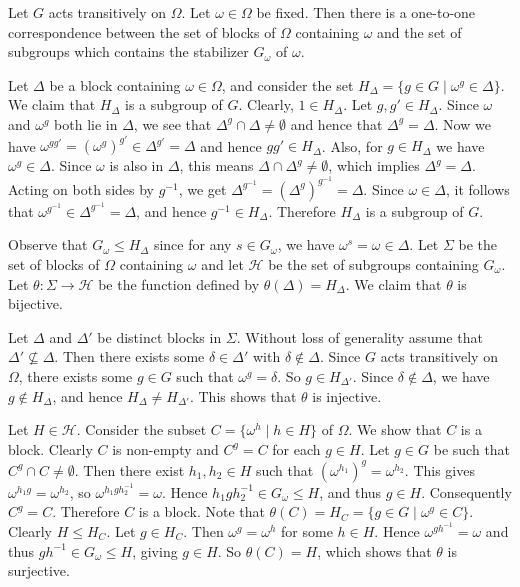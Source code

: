 \begin{proposition} \label{prop-block-and-stab}
	Let $G$ acts transitively on $\Omega$. Let $\omega\in \Omega$ be fixed. Then there is a one-to-one correspondence between the set of blocks of $\Omega$ containing $\omega$ and the set of subgroups which contains the stabilizer $G_\omega$ of $\omega$.
\end{proposition}
\begin{sketch}
	Let $\Delta$ be a block containing $\omega \in \Omega$, and consider the set $H_\Delta = \{g \in G \mid \omega^g \in \Delta\}$. We claim that $H_\Delta$ is a subgroup of  $G$. Clearly, $1 \in H_\Delta$. Let $g,g' \in H_\Delta$. Since $\omega$ and $\omega^g$ both lie in $\Delta$, we see that $\Delta^g \cap \Delta\neq \emptyset$ and hence that $\Delta^g = \Delta$. Now we have $\omega^{gg'} = (\omega^g)^{g'} \in \Delta^{g'} = \Delta$ and hence $gg' \in H_\Delta$. Also, for $g \in H_\Delta$ we have $\omega^g \in \Delta$. Since $\omega$ is also in $\Delta$, this means $\Delta \cap \Delta^g \neq \emptyset$, which implies $\Delta^g = \Delta$. Acting on both sides by $g^{-1}$, we get $\Delta^{g^{-1}} = (\Delta^g)^{g^{-1}} = \Delta$. Since $\omega \in \Delta$, it follows that $\omega^{g^{-1}} \in \Delta^{g^{-1}} = \Delta$, and hence $g^{-1} \in H_\Delta$. Therefore $H_\Delta$ is a subgroup of $G$.
	
	Observe that $G_\omega \le H_\Delta$ since for any $s \in G_\omega$, we have $\omega^s=\omega \in \Delta$.  Let $\Sigma$ be the set of blocks of $\Omega$ containing $\omega$ and let $\mathcal{H}$ be the set of subgroups containing $G_\omega$. Let $\theta:\Sigma\rightarrow \mathcal{H}$ be the function defined by $\theta(\Delta)=H_\Delta$. We claim that $\theta$ is bijective.
	
	Let $\Delta$ and $\Delta'$ be distinct blocks in $\Sigma$. Without loss of generality assume that $\Delta'\not\subseteq \Delta$. Then there exists some  $\delta \in \Delta'$ with $\delta \notin \Delta$. Since $G$ acts transitively on $\Omega$, there exists some $g \in G$ such that $\omega^g = \delta$. So $g \in H_{\Delta'}$. Since $\delta\not\in \Delta$, we have $g \notin H_\Delta$, and hence $H_\Delta \ne H_{\Delta'}$. This shows that $\theta$ is injective.
	
	Let $H\in\mathcal{H}$. Consider the subset $C = \{\omega^h \mid h \in H\}$ of $\Omega$. We show that $C$ is a block. Clearly $C$ is non-empty and $C^g = C$ for each $g\in H$. Let $g \in G$ be such that $C^g \cap C\neq \emptyset$. Then there exist $h_1, h_2 \in H$ such that $(\omega^{h_1})^g = \omega^{h_2}$. This gives $\omega^{h_1g} = \omega^{h_2}$, so $\omega^{h_1gh_2^{-1}} = \omega$. Hence $h_1gh_2^{-1} \in G_\omega \le H$, and thus $g \in H$. Consequently $C^g = C$. Therefore $C$ is a block. Note that $\theta(C) = H_C = \{g \in G \mid \omega^g \in C\}$. Clearly $H \le H_C$. Let $g \in H_C$. Then $\omega^g = \omega^h$ for some $h \in H$. Hence $\omega^{gh^{-1}} = \omega$ and thus $gh^{-1} \in G_\omega \le H$, giving $g \in H$. So $\theta(C) = H$, which shows that $\theta$ is surjective.
\end{sketch}
